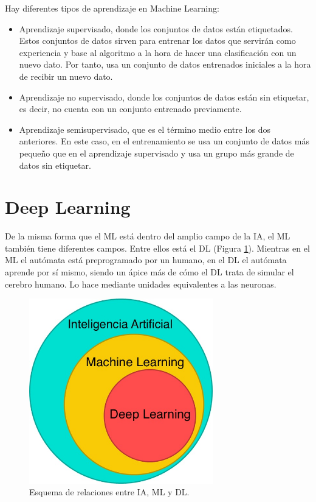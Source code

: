Hay diferentes tipos de aprendizaje en Machine Learning:
\begin{itemize}
 \item Aprendizaje supervisado, donde los conjuntos de datos están etiquetados. Estos conjuntos de datos sirven para entrenar los datos que servirán como experiencia y base al algoritmo a la hora de hacer una clasificación con un nuevo dato. Por tanto, usa un conjunto de datos entrenados iniciales a la hora de recibir un nuevo dato.
 \item Aprendizaje no supervisado, donde los conjuntos de datos están sin etiquetar, es decir, no cuenta con un conjunto entrenado previamente.
 \item Aprendizaje semisupervisado, que es el término medio entre los dos anteriores. En este caso, en el entrenamiento se usa un conjunto de datos más pequeño que en el aprendizaje supervisado y usa un grupo más grande de datos sin etiquetar.
\end{itemize}

\section{Deep Learning}
De la misma forma que el ML está dentro del amplio campo de la IA, el ML también tiene diferentes campos. Entre ellos está el DL (Figura \ref{fig:ia_ml_dl}). Mientras en el ML el autómata está preprogramado por un humano, en el DL el autómata aprende por sí mismo, siendo un ápice más de cómo el DL trata de simular el cerebro humano. Lo hace mediante unidades equivalentes a las neuronas.\\
\begin{figure} [h!]
  \begin{center}
    \includegraphics[width=8cm]{figs/ia_ml_dl}
  \end{center}
  \caption{Esquema de relaciones entre IA, ML y DL.}
  \label{fig:ia_ml_dl}
\end{figure}

